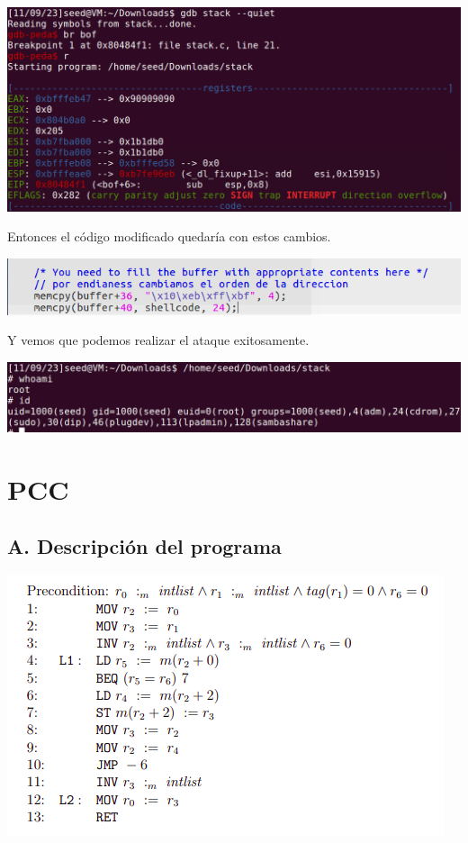 \documentclass[11pt]{article}
\begin{document}
\begin{center}
\includegraphics[scale=0.5]{findingreturnaddress.png}
\end{center}

Entonces el código modificado quedaría con estos cambios.

\begin{center}
\includegraphics[scale=0.8]{codigomodif.png}
\end{center}

Y vemos que podemos realizar el ataque exitosamente.

\begin{center}
\includegraphics[scale=0.5]{successfulattack.png}
\end{center}

\newpage

\section{PCC}

\subsection*{A. Descripción del programa}

\begin{center}
\includegraphics[scale=0.7]{progPCC.png}
\end{center}
\end{document}
